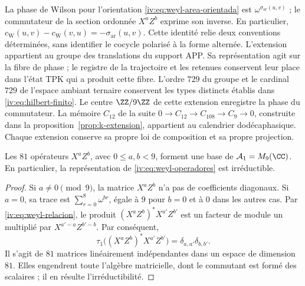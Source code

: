 La phase de Wilson pour l’orientation
\eqref{iv:eq:weyl-area-orientada} est
\(\omega^{\sigma_{\mathrm{ar}}(u,v)}\) ; le commutateur de la
section ordonnée \(X^aZ^b\) exprime son inverse. En particulier,
\(c_{\mathrm W}(u,v)-c_{\mathrm W}(v,u)
=-\sigma_{\mathrm{ar}}(u,v)\).
Cette identité relie deux conventions déterminées, sans identifier
le cocycle polarisé à la forme alternée. L’extension appartient
au groupe des translations du support APP. Sa représentation agit sur
la fibre de phase ; le registre de la trajectoire et les retenues conservent
leur place dans l’état TPK qui a produit cette fibre. L’ordre \(729\)
du groupe et le cardinal \(729\) de l’espace ambiant ternaire conservent les
types distincts établis dans \eqref{iv:eq:hilbert-finito}.
Le centre \(\ZZ/9\ZZ\) de cette extension enregistre la phase
du commutateur. La mémoire \(C_{12}\) de la suite
\(0\to C_{12}\to C_{108}\to C_9\to0\), construite dans la
proposition~\ref{prop:k-extension}, appartient au calendrier
dodécaphasique. Chaque extension conserve sa propre loi de composition et
sa propre projection.

\begin{proposition}
\label{iv:prop:weyl-completo}
Les \(81\) opérateurs \(X^aZ^b\), avec \(0\leq a,b<9\), forment
une base de \(\mathcal A_1=M_9(\CC)\). En particulier, la
représentation de \eqref{iv:eq:weyl-operadores} est irréductible.
\end{proposition}
\begin{proof}
Si \(a\neq0\pmod9\), la matrice \(X^aZ^b\) n’a pas de coefficients
diagonaux. Si \(a=0\), sa trace est
\(\sum_{r=0}^8\omega^{br}\), égale à \(9\) pour \(b=0\) et à
\(0\) dans les autres cas. Par \eqref{iv:eq:weyl-relacion}, le
produit \((X^aZ^b)^*X^{a'}Z^{b'}\) est un facteur de module un
multiplié par \(X^{a'-a}Z^{b'-b}\). Par conséquent,
\[
 \tau_1\bigl((X^aZ^b)^*X^{a'}Z^{b'}\bigr)
 =\delta_{a,a'}\delta_{b,b'}.
\]
Il s'agit de \(81\) matrices linéairement indépendantes dans un espace de dimension \(81\). Elles engendrent toute l'algèbre matricielle, dont le commutant est formé des scalaires ; il en résulte l'irréductibilité.
\end{proof}

